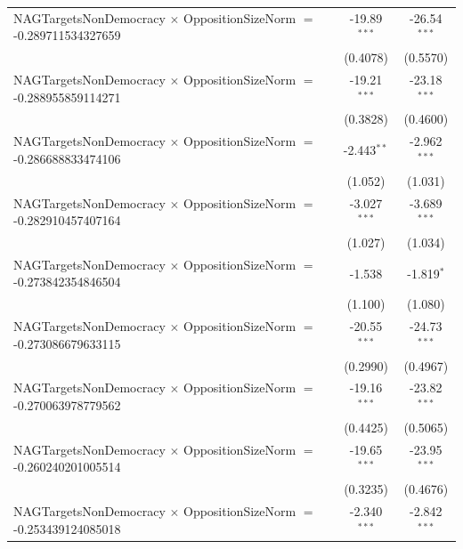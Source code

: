 \begin{tabular}{lcc}
   NAGTargetsNonDemocracy $\times$ OppositionSizeNorm $=$ -0.289711534327659    & -19.89$^{***}$       & -26.54$^{***}$\\   
                                                                                & (0.4078)             & (0.5570)\\   
   NAGTargetsNonDemocracy $\times$ OppositionSizeNorm $=$ -0.288955859114271    & -19.21$^{***}$       & -23.18$^{***}$\\   
                                                                                & (0.3828)             & (0.4600)\\   
   NAGTargetsNonDemocracy $\times$ OppositionSizeNorm $=$ -0.286688833474106    & -2.443$^{**}$        & -2.962$^{***}$\\   
                                                                                & (1.052)              & (1.031)\\   
   NAGTargetsNonDemocracy $\times$ OppositionSizeNorm $=$ -0.282910457407164    & -3.027$^{***}$       & -3.689$^{***}$\\   
                                                                                & (1.027)              & (1.034)\\   
   NAGTargetsNonDemocracy $\times$ OppositionSizeNorm $=$ -0.273842354846504    & -1.538               & -1.819$^{*}$\\   
                                                                                & (1.100)              & (1.080)\\   
   NAGTargetsNonDemocracy $\times$ OppositionSizeNorm $=$ -0.273086679633115    & -20.55$^{***}$       & -24.73$^{***}$\\   
                                                                                & (0.2990)             & (0.4967)\\   
   NAGTargetsNonDemocracy $\times$ OppositionSizeNorm $=$ -0.270063978779562    & -19.16$^{***}$       & -23.82$^{***}$\\   
                                                                                & (0.4425)             & (0.5065)\\   
   NAGTargetsNonDemocracy $\times$ OppositionSizeNorm $=$ -0.260240201005514    & -19.65$^{***}$       & -23.95$^{***}$\\   
                                                                                & (0.3235)             & (0.4676)\\   
   NAGTargetsNonDemocracy $\times$ OppositionSizeNorm $=$ -0.253439124085018    & -2.340$^{***}$       & -2.842$^{***}$\\   

\end{tabular}
